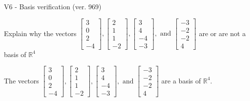 \begin{exercise}
  \begin{exerciseTitle}V6 - Basis verification (ver. 969)\end{exerciseTitle}
  \begin{exerciseStatement}
    Explain why the vectors \(\left[\begin{array}{r}
3 \\
0 \\
2 \\
-4
\end{array}\right] , \left[\begin{array}{r}
2 \\
1 \\
1 \\
-2
\end{array}\right] , \left[\begin{array}{r}
3 \\
4 \\
-4 \\
-3
\end{array}\right] , \text{ and } \left[\begin{array}{r}
-3 \\
-2 \\
-2 \\
4
\end{array}\right]\) are or are not a basis of \(\mathbb{R}^4\)	


  \end{exerciseStatement}
  \begin{exerciseAnswer}
   The vectors \(\left[\begin{array}{r}
3 \\
0 \\
2 \\
-4
\end{array}\right] , \left[\begin{array}{r}
2 \\
1 \\
1 \\
-2
\end{array}\right] , \left[\begin{array}{r}
3 \\
4 \\
-4 \\
-3
\end{array}\right] , \text{ and } \left[\begin{array}{r}
-3 \\
-2 \\
-2 \\
4
\end{array}\right]\) 
  	 are  a basis of \(\mathbb{R}^4\).
  


  \end{exerciseAnswer}
\end{exercise}
